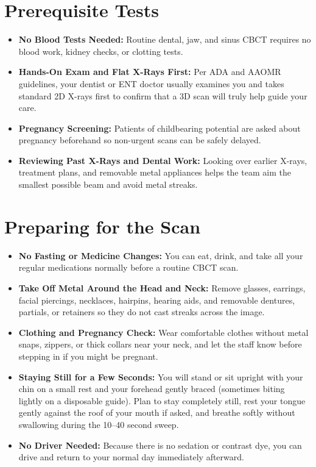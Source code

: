 \section{Prerequisite Tests}
\begin{itemize}
    \item \textbf{No Blood Tests Needed:} Routine dental, jaw, and sinus CBCT requires no blood work, kidney checks, or clotting tests.
    \item \textbf{Hands-On Exam and Flat X-Rays First:} Per ADA and AAOMR guidelines, your dentist or ENT doctor usually examines you and takes standard 2D X-rays first to confirm that a 3D scan will truly help guide your care.
    \item \textbf{Pregnancy Screening:} Patients of childbearing potential are asked about pregnancy beforehand so non-urgent scans can be safely delayed.
    \item \textbf{Reviewing Past X-Rays and Dental Work:} Looking over earlier X-rays, treatment plans, and removable metal appliances helps the team aim the smallest possible beam and avoid metal streaks.
\end{itemize}

\section{Preparing for the Scan}
\begin{itemize}
    \item \textbf{No Fasting or Medicine Changes:} You can eat, drink, and take all your regular medications normally before a routine CBCT scan.
    \item \textbf{Take Off Metal Around the Head and Neck:} Remove glasses, earrings, facial piercings, necklaces, hairpins, hearing aids, and removable dentures, partials, or retainers so they do not cast streaks across the image.
    \item \textbf{Clothing and Pregnancy Check:} Wear comfortable clothes without metal snaps, zippers, or thick collars near your neck, and let the staff know before stepping in if you might be pregnant.
    \item \textbf{Staying Still for a Few Seconds:} You will stand or sit upright with your chin on a small rest and your forehead gently braced (sometimes biting lightly on a disposable guide). Plan to stay completely still, rest your tongue gently against the roof of your mouth if asked, and breathe softly without swallowing during the 10--40 second sweep.
    \item \textbf{No Driver Needed:} Because there is no sedation or contrast dye, you can drive and return to your normal day immediately afterward.
\end{itemize}

